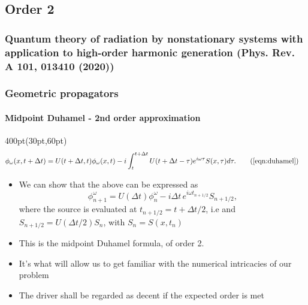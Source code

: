\begin{frame}

\end{frame}



\subsection{Order 2}

\begin{frame}
\frametitle{Quantum theory of radiation by nonstationary systems 
	with application to high-order harmonic generation
        (Phys. Rev. A 101, 013410 (2020))}
\frametitle{Geometric propagators}
	\framesubtitle{Midpoint Duhamel - 2nd order approximation}
\footnotesize
\begin{textblock*}{400pt}(30pt,60pt)
\begin{align}
       \phi_\omega(x,t+\Delta t) & = U(t+\Delta t,t)\phi_\omega(x,t)
	  -i\int_{t}^{t+\Delta t} U(t+\Delta t-\tau)e^{i\omega \tau} S(x,\tau)d\tau. \tag{\ref{eqn:duhamel}}
\end{align}
\begin{itemize}
\item We can show that the above can be expressed as
	\begin{equation}
		\phi^\omega_{n+1} = U(\Delta t) \phi^\omega_{n}
		-i\Delta t\,e^{i\omega t_{n+1/2}}S_{n+1/2},
		 \label{eqn:midpoint_duhamel}
	\end{equation}
		where the source is evaluated at $t_{n+1/2} = t+\Delta t/2$, i.e
		 and $S_{n+1/2} = U(\Delta t/2) S_n$,  with $S_n = S(x,t_n)$
		\vspace{20pt}
\item This is the midpoint Duhamel formula, of order 2.
\item It's what will allow us to get familiar with 
	the numerical intricacies of our problem 
\item The driver shall be regarded as decent if the expected order is met
\end{itemize}

\end{textblock*}

\end{frame}


